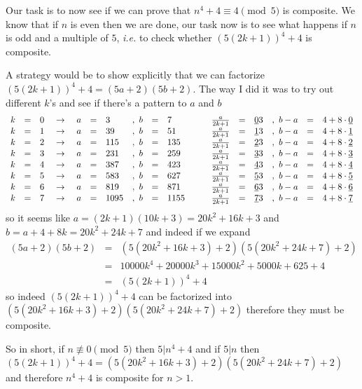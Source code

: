 \documentclass[aps,preprint,preprintnumbers,nofootinbib,showpacs,prd]{revtex4-1}
\newcommand{\ie}{{\it i.e.} }
\newcommand{\nbea}{\begin{eqnarray*}}
\newcommand{\neea}{\end{eqnarray*}}
\begin{document}
Our task is to now see if we can prove that $n^4 + 4 \equiv 4 \pmod{5}$ is composite. We know that if $n$ is even then we are done, our task now is to see what happens if $n$ is odd and a multiple of $5$, \ie to check whether $(5(2k+1))^4 + 4$ is composite.

A strategy would be to show explicitly that we can factorize $(5(2k+1))^4 + 4 = (5a + 2)(5b + 2)$. The way I did it was to try out different $k$'s and see if there's a pattern to $a$ and $b$
%
\nbea
\begin{array}{r c l c r c l r c l c r c l r c l}
k &=& 0 & ~\to~ & a &=& 3 &,~b&=&7 &~~~& \frac{a}{2k+1} &=& \underline{0}3 &,~b-a &=& 4  + 8\cdot \underline{0}\\
k &=& 1 & ~\to~ & a &=& 39 &,~b&=&51 &~~~& \frac{a}{2k+1} &=& \underline{1}3 &,~b-a &=& 4 + 8\cdot \underline{1} \\
k &=& 2 & ~\to~ & a &=& 115 &,~b&=&135 &~~~& \frac{a}{2k+1} &=& \underline{2}3 &,~b-a &=& 4  + 8\cdot \underline{2}\\
k &=& 3 & ~\to~ & a &=& 231 &,~b&=&259 &~~~& \frac{a}{2k+1} &=& \underline{3}3 &,~b-a &=& 4  + 8\cdot \underline{3}\\
k &=& 4 & ~\to~ & a &=& 387 &,~b&=&423 &~~~& \frac{a}{2k+1} &=& \underline{4}3 &,~b-a &=& 4  + 8\cdot \underline{4}\\
k &=& 5 & ~\to~ & a &=& 583 &,~b&=&627 &~~~& \frac{a}{2k+1} &=& \underline{5}3 &,~b-a &=& 4  + 8\cdot \underline{5}\\
k &=& 6 & ~\to~ & a &=& 819 &,~b&=&871 &~~~& \frac{a}{2k+1} &=& \underline{6}3 &,~b-a &=& 4  + 8\cdot \underline{6}\\
k &=& 7 & ~\to~ & a &=& 1095 &,~b&=&1155 &~~~& \frac{a}{2k+1} &=& \underline{7}3 &,~b-a &=& 4  + 8\cdot \underline{7}
\end{array}
\neea
%
so it seems like $a = (2k+1)(10k+3) = 20k^2+16k+3$ and $b = a + 4 + 8k= 20k^2+24k+7$ and indeed if we expand
%
\nbea
(5a + 2)(5b + 2) & = & (5(20k^2+16k+3) + 2)(5(20k^2+24k+7) + 2) \\
& = & 10000k^4+20000k^3+15000k^2+5000k+625 + 4 \\
& = & (5(2k+1))^4 + 4
\neea
%
so indeed $(5(2k+1))^4 + 4$ can be factorized into $(5(20k^2+16k+3) + 2)(5(20k^2+24k+7) + 2)$ therefore they must be composite.

So in short, if $n \not\equiv 0 \pmod{5}$ then $5|n^4 + 4$ and if $5|n$ then $(5(2k+1))^4 + 4 = (5(20k^2+16k+3) + 2)(5(20k^2+24k+7) + 2)$ and therefore $n^4 + 4$ is composite for $n>1$.
\end{document}
